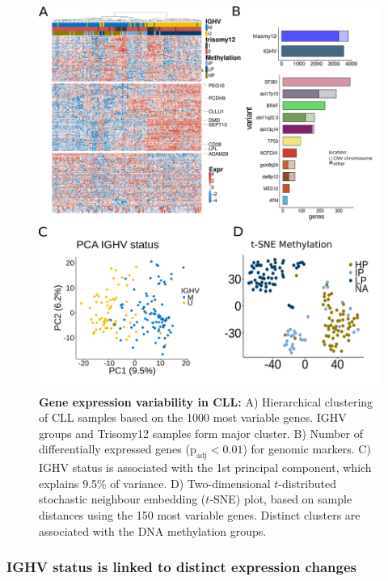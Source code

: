 \begin{figure}
	\centering
	\includegraphics[width=\columnwidth]{figures/data_overview_geneCluster_new.pdf}
	\caption{\textbf{Gene expression variability in CLL:} A) Hierarchical clustering of CLL samples based on the 1000 most variable genes. IGHV groups and Trisomy12 samples form major cluster. B) Number of differentially expressed genes ($\text{p}_\text{adj} < 0.01$) for genomic markers. C) IGHV status is associated with the 1st principal component, which explains 9.5\% of variance. D) Two-dimensional $t$-distributed stochastic neighbour embedding ($t$-SNE) plot, based on sample distances using the 150 most variable genes. Distinct clusters are associated with the DNA methylation groups.}
	\label{fig:data_overview}
\end{figure}

\clearpage

\subsubsection{IGHV status is linked to distinct expression changes} 

